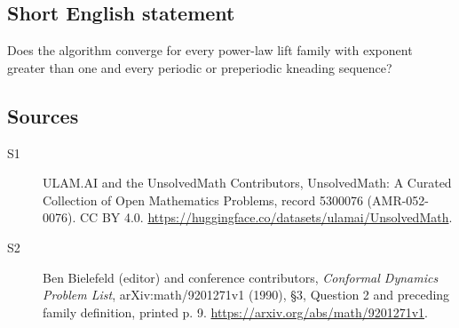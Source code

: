 \documentclass[11pt]{article}
\begin{document}
\subsection{Short English statement}
Does the algorithm converge for every power-law lift family with exponent greater than one and every periodic or preperiodic kneading sequence?
\subsection{Sources}
\begin{description}
\item[\hypertarget{source:5300076:1}{S1}] ULAM.AI and the UnsolvedMath Contributors, UnsolvedMath: A Curated Collection of Open Mathematics Problems, record 5300076 (AMR-052-0076). CC BY 4.0. \url{https://huggingface.co/datasets/ulamai/UnsolvedMath}.
\item[\hypertarget{source:5300076:2}{S2}] Ben Bielefeld (editor) and conference contributors, \emph{Conformal Dynamics Problem List}, arXiv:math/9201271v1 (1990), \S3, Question 2 and preceding family definition, printed p. 9. \url{https://arxiv.org/abs/math/9201271v1}.
\end{description}
\label{end:5300076}
\end{document}
